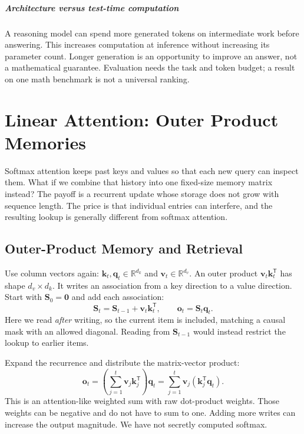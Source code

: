 \documentclass[11pt, oneside]{book}
\newcommand{\R}{\mathbb{R}}
\newcommand{\T}{^{\mathsf{T}}}           %
\let\originalsection\section
\renewcommand{\section}{\Needspace{7\baselineskip}\originalsection}
\begin{document}
\paragraph{Architecture versus test-time computation} A reasoning model can spend more generated tokens on intermediate work before answering. This increases computation at inference without increasing its parameter count. Longer generation is an opportunity to improve an answer, not a mathematical guarantee. Evaluation needs the task and token budget; a result on one math benchmark is not a universal ranking.

\chapter{Linear Attention: Outer Product Memories}\label{ch:source-6}
Softmax attention keeps past keys and values so that each new query can inspect them. What if we combine that history into one fixed-size memory matrix instead? The payoff is a recurrent update whose storage does not grow with sequence length. The price is that individual entries can interfere, and the resulting lookup is generally different from softmax attention.

\section{Outer-Product Memory and Retrieval}\label{sec:linear-memory}
Use column vectors again: $\mathbf{k}_t,\mathbf{q}_t\in\R^{d_k}$ and $\mathbf{v}_t\in\R^{d_v}$. An outer product $\mathbf{v}_t\mathbf{k}_t\T$ has shape $d_v\times d_k$. It writes an association from a key direction to a value direction. Start with $\mathbf{S}_0=\mathbf{0}$ and add each association:
\[
 \mathbf{S}_t=\mathbf{S}_{t-1}+\mathbf{v}_t\mathbf{k}_t\T,
 \qquad \mathbf{o}_t=\mathbf{S}_t\mathbf{q}_t.
\]
Here we read \emph{after} writing, so the current item is included, matching a causal mask with an allowed diagonal. Reading from $\mathbf{S}_{t-1}$ would instead restrict the lookup to earlier items.

Expand the recurrence and distribute the matrix-vector product:
\[
 \mathbf{o}_t=\left(\sum_{j=1}^t\mathbf{v}_j\mathbf{k}_j\T\right)\mathbf{q}_t
 =\sum_{j=1}^t\mathbf{v}_j(\mathbf{k}_j\T\mathbf{q}_t).
\]
This is an attention-like weighted sum with raw dot-product weights. Those weights can be negative and do not have to sum to one. Adding more writes can increase the output magnitude. We have not secretly computed softmax.
\end{document}

